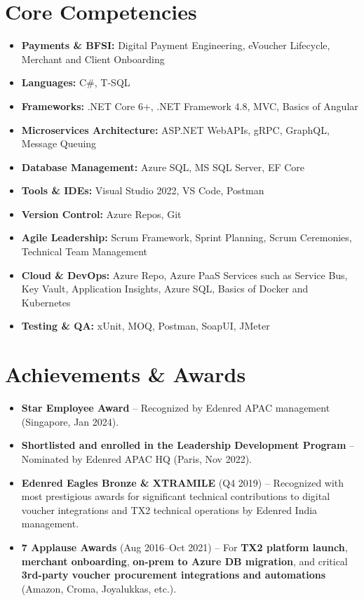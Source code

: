 \documentclass[12pt,a4paper]{article}
\begin{document}
\section*{Core Competencies}
\begin{itemize}
    \item \textbf{Payments \& BFSI:} Digital Payment Engineering, eVoucher Lifecycle, Merchant and Client Onboarding
    \item \textbf{Languages:} C\#, T-SQL
    \item \textbf{Frameworks:} .NET Core 6+, .NET Framework 4.8, MVC, Basics of Angular
    \item \textbf{Microservices Architecture:} ASP.NET WebAPIs, gRPC,  GraphQL, Message Queuing
    \item \textbf{Database Management:} Azure SQL, MS SQL Server, EF Core
    \item \textbf{Tools \& IDEs:} Visual Studio 2022, VS Code, Postman
    \item \textbf{Version Control:} Azure Repos, Git
    \item \textbf{Agile Leadership:} Scrum Framework, Sprint Planning, Scrum Ceremonies, Technical Team Management
    \item \textbf{Cloud \& DevOps:} Azure Repo, Azure PaaS Services such as Service Bus, Key Vault, Application Insights, Azure SQL,  Basics of Docker and Kubernetes
    \item \textbf{Testing \& QA:} xUnit, MOQ, Postman, SoapUI, JMeter
\end{itemize}

\section*{Achievements \& Awards}
\begin{itemize}
    \item \textbf{Star Employee Award} -- Recognized by Edenred APAC management (Singapore, Jan 2024).
    \item \textbf{Shortlisted and enrolled in the Leadership Development Program} -- Nominated by Edenred APAC HQ (Paris, Nov 2022).
    \item \textbf{Edenred Eagles Bronze \& XTRAMILE} (Q4 2019) -- Recognized with most prestigious awards for significant technical contributions to digital voucher integrations and TX2 technical operations by Edenred India management.
    \item \textbf{7 Applause Awards} (Aug 2016--Oct 2021) -- For \textbf{TX2 platform launch}, \textbf{merchant onboarding}, \textbf{on-prem to Azure DB migration}, and critical \textbf{3rd-party voucher procurement integrations and automations} (Amazon, Croma, Joyalukkas, etc.).
\end{itemize}
\end{document}

